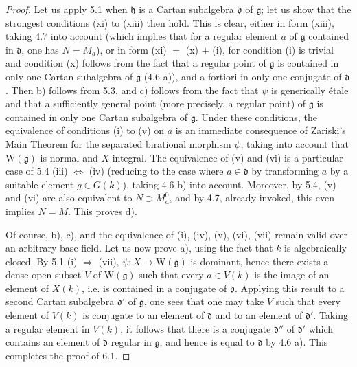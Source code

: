 \begin{proof}
Let us apply 5.1 when $\mathfrak h$ is a Cartan subalgebra
$\mathfrak d$ of $\mathfrak g$; let us show that the strongest
conditions (xi) to (xiii) then hold. This is clear, either
in form (xiii), taking 4.7 into account (which implies that
for a regular element $a$ of $\mathfrak g$ contained in
$\mathfrak d$, one has $N=M_a$), or in form (xi) $=$ (x) $+$
(i), for condition (i) is trivial and condition (x) follows
from the fact that a regular point of $\mathfrak g$ is
contained in only one Cartan subalgebra of $\mathfrak g$
(4.6 a)), and a fortiori in only one conjugate of
$\mathfrak d$. Then b) follows from 5.3, and c) follows
from the fact that $\psi$ is generically \'etale and that
a sufficiently general point (more precisely, a regular
point) of $\mathfrak g$ is contained in only one Cartan
subalgebra of $\mathfrak g$. Under these conditions, the
equivalence of conditions (i) to (v) on $a$ is an immediate
consequence of Zariski's Main Theorem for the separated
birational morphism $\psi$, taking into account that
$\mathrm W(\mathfrak g)$ is normal and $X$ integral.
The equivalence of (v) and (vi) is a particular case of
5.4 (iii) $\Leftrightarrow$ (iv) (reducing to the case where
$a\in\mathfrak d$ by transforming $a$ by a suitable element
$g\in G(k)$), taking 4.6 b) into account. Moreover, by 5.4,
(v) and (vi) are also equivalent to $N\supset M_a^0$, and
by 4.7, already invoked, this even implies $N=M$.
This proves d).

Of course, b), c), and the equivalence of (i), (iv), (v),
(vi), (vii) remain valid over an arbitrary base field.
Let us now prove a), using the fact that $k$ is algebraically
closed. By 5.1 (i) $\Rightarrow$ (vii),
$\psi:X\to\mathrm W(\mathfrak g)$ is dominant, hence there
exists a dense open subset $V$ of $\mathrm W(\mathfrak g)$
such that every $a\in V(k)$ is the image of an element
of $X(k)$, i.e. is contained in a conjugate of
$\mathfrak d$. Applying this result to a second Cartan
subalgebra $\mathfrak d'$ of $\mathfrak g$, one sees
that one may take $V$ such that every element of $V(k)$
is conjugate to an element of $\mathfrak d$ and to an
element of $\mathfrak d'$. Taking a regular element
in $V(k)$, it follows that there is a conjugate
$\mathfrak d''$ of $\mathfrak d'$ which contains an
element of $\mathfrak d$ regular in $\mathfrak g$,
and hence is equal to $\mathfrak d$ by 4.6 a).
This completes the proof of 6.1.
\end{proof}

